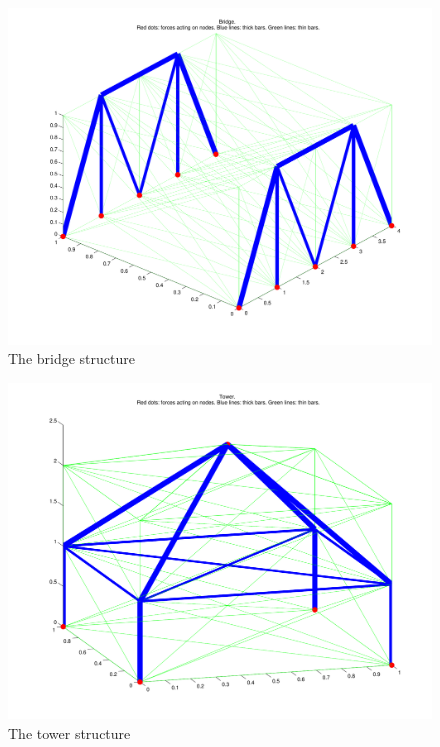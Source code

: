   
\begin{figure}[H]
\centerline{\includegraphics[scale=0.4]{../Ferdig kode/bridge.pdf}}
\caption{The bridge structure}
\label{fig:bridge}
\end{figure}

\begin{figure}[H]
\centerline{\includegraphics[scale=0.4]{../Ferdig kode/tower.pdf}}
\caption{The tower structure}
\label{fig:tower}
\end{figure}

